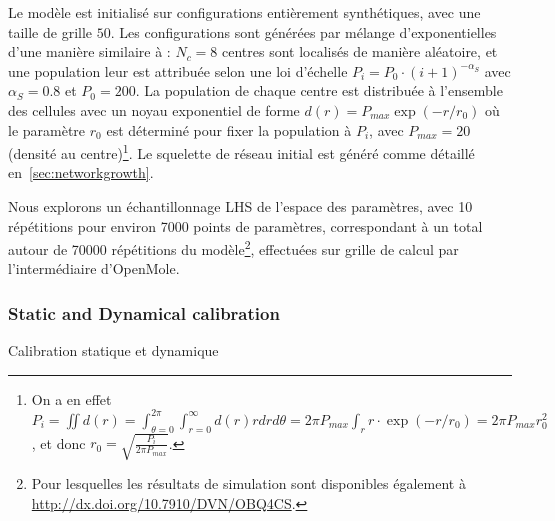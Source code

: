 Le modèle est initialisé sur configurations entièrement synthétiques, avec une taille de grille $50$. Les configurations sont générées par mélange d'exponentielles d'une manière similaire à \cite{anas1998urban} : $N_c = 8$ centres sont localisés de manière aléatoire, et une population leur est attribuée selon une loi d'échelle $P_i = P_0\cdot (i+1)^{-\alpha_S}$ avec $\alpha_S = 0.8$ et $P_0 = 200$. La population de chaque centre est distribuée à l'ensemble des cellules avec un noyau exponentiel de forme $d(r) = P_{max}\exp\left( - r / r_0\right)$ où le paramètre $r_0$ est déterminé pour fixer la population à $P_i$, avec $P_{max} = 20$ (densité au centre)\footnote{On a en effet $P_i = \iint d(r) = \int_{\theta=0}^{2\pi} \int_{r=0}^{\infty} d(r) rdrd\theta = 2 \pi P_{max} \int_r r\cdot \exp\left( - r / r_0\right) = 2 \pi P_{max} r_0^2$, et donc $r_0 = \sqrt{\frac{P_i}{2\pi P_{max}}}$.}. Le squelette de réseau initial est généré comme détaillé en~\ref{sec:networkgrowth}.

Nous explorons un échantillonnage LHS de l'espace des paramètres, avec 10 répétitions pour environ 7000 points de paramètres, correspondant à un total autour de 70000 répétitions du modèle\footnote{Pour lesquelles les résultats de simulation sont disponibles également à \url{http://dx.doi.org/10.7910/DVN/OBQ4CS}.}, effectuées sur grille de calcul par l'intermédiaire d'OpenMole.



\subsubsection{Static and Dynamical calibration}{Calibration statique et dynamique}




